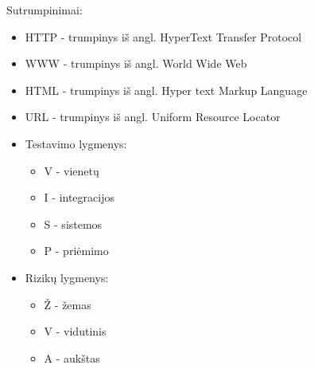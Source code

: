Sutrumpinimai:

\begin{itemize}
	\item HTTP - trumpinys iš angl. HyperText Transfer Protocol
	\item WWW - trumpinys iš angl. World Wide Web
	\item HTML - trumpinys iš angl. Hyper text Markup Language
	\item URL - trumpinys iš angl. Uniform Resource Locator
	\item Testavimo lygmenys:
		\begin{itemize}
			\item V - vienetų
			\item I - integracijos
			\item S - sistemos
			\item P - priėmimo
		\end{itemize}
	\item Rizikų lygmenys:
		\begin{itemize}
			\item Ž - žemas
			\item V - vidutinis
			\item A - aukštas
		\end{itemize}
\end{itemize}
